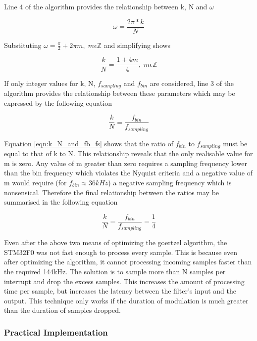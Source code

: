 Line 4 of the algorithm provides the relationship between k, N and $\omega$

\begin{equation}
	\omega = \frac{2\pi * k}{N}
\end{equation}

Substituting \(\omega = \frac{\pi}{2} + 2\pi m,\; m\epsilon \mathbb{Z}\) and simplifying shows

\begin{equation}
\label{eqn:k_N_constraint}
	\frac{k}{N} = \frac{1+4m}{4},\; m\epsilon \mathbb{Z}
\end{equation}

If only integer values for k, N, $f_{sampling}$ and $f_{bin}$ are considered, line 3 of the algorithm provides the relationship between these parameters which may be expressed by the following equation

\begin{equation}
\label{eqn:k_N_and_fb_fs}
	\frac{k}{N} = \frac{f_{bin}}{f_{sampling}}
\end{equation}


Equation \ref{eqn:k_N_and_fb_fs} shows that the ratio of $f_{bin}$ to $f_{sampling}$ must be equal to that of k to N. This relationship reveals that the only realisable value for m is zero. Any value of m greater than zero requires a sampling frequency lower than the bin frequency which violates the Nyquist criteria and a negative value of m would require (for $f_{bin} \approx 36kHz$) a negative sampling frequency which is nonsensical. Therefore the final relationship between the ratios may be summarised in the following equation

\begin{equation}
\label{eqn:k_N_and_fb_fs_ratio}
\frac{k}{N} = \frac{f_{bin}}{f_{sampling}} = \frac{1}{4}
\end{equation}

Even after the above two means of optimizing the goertzel algorithm, the STM32F0 was not fast enough to process every sample. This is because even after optimizing the algorithm, it cannot processing incoming samples faster than the required 144kHz. The solution is to sample more than N samples per interrupt and drop the excess samples. This increases the amount of processing time per sample, but increases the latency between the filter's input and the output. This technique only works if the duration of modulation is much greater than the duration of samples dropped.

\subsubsection{Practical Implementation}

